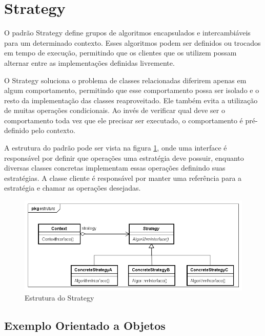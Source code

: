 \section{Strategy}


O padrão Strategy define grupos de algoritmos encapsulados e
intercambiáveis para um determinado contexto. Esses 
algoritmos podem ser definidos ou trocados em tempo de 
execução, permitindo que os clientes que os utilizem possam
alternar entre as implementações definidas livremente.

O Strategy soluciona o problema de classes relacionadas 
diferirem apenas em algum comportamento, permitindo que 
esse comportamento possa ser isolado e o resto da implementação 
das classes reaproveitado. Ele também evita a utilização de 
muitas operações condicionais. Ao invés de verificar qual 
deve ser o comportamento toda vez que ele precisar ser 
executado, o comportamento é pré-definido pelo contexto. 

A estrutura do padrão pode ser vista na figura \ref{strategy_struct}, 
onde uma interface é responsável por definir que operações 
uma estratégia deve possuir, enquanto diversas classes 
concretas implementam essas operações definindo suas 
estratégias. A classe cliente é responsável por manter 
uma referência para a estratégia e chamar as 
operações desejadas.

\begin{figure}[htb]
	\caption{\label{strategy_struct}Estrutura do Strategy}
	\begin{center}
	    \includegraphics[scale=0.5]{5_padroes-contexto-funcional/5.3_comportamentais/5.3.09_strategy/strategy_estrutura.png}
	\end{center}
\end{figure}

\subsection*{Exemplo Orientado a Objetos}

